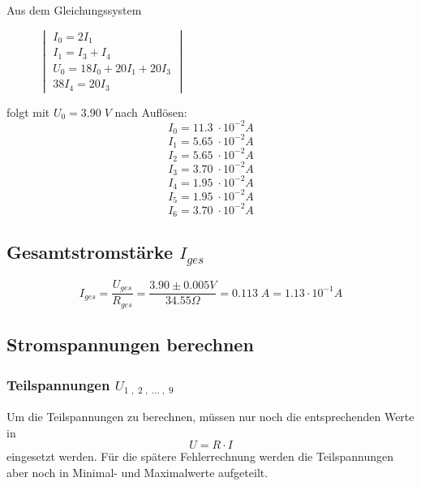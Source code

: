 \documentclass[a4paper,12pt]{article}
\begin{document}
Aus dem Gleichungssystem \\

\begin{figure}[H]
\centering
$\begin{vmatrix}
I_0 = 2I_1 \\
I_1 = I_3 + I_4 \\
U_0 = 18I_0 + 20I_1 + 20I_3\\
38I_4 = 20I_3
\end{vmatrix}$\\
\end{figure}

folgt mit $U_0 = 3.90\; V$ nach Auflösen:\\

$$I_0 = 11.3\; \cdot 10^{-2}A$$
$$I_1 = 5.65\; \cdot 10^{-2} A$$
$$I_2 = 5.65\; \cdot 10^{-2} A$$
$$I_3 = 3.70\; \cdot 10^{-2} A$$
$$I_4 = 1.95\; \cdot 10^{-2} A$$
$$I_5 = 1.95\; \cdot 10^{-2} A$$
$$I_6 = 3.70\; \cdot 10^{-2} A$$


\subsection{Gesamtstromstärke $I_{ges}$}

$$I_{ges} = \frac{U_{ges}}{R_{ges}} = \frac{3.90 \pm 0.005 V}{34.55\Omega} = 0.113 \;A = 1.13 \cdot 10^{-1} A$$

\subsection{Stromspannungen berechnen}

\subsubsection{Teilspannungen $U_{1\;,\;2\;,\; ...\;,\; 9}$}

Um die Teilspannungen zu berechnen, müssen nur noch die entsprechenden Werte in $$U = R \cdot I$$ eingesetzt werden. Für die spätere Fehlerrechnung werden die Teilspannungen aber noch in Minimal- und Maximalwerte aufgeteilt.\\
\end{document}
